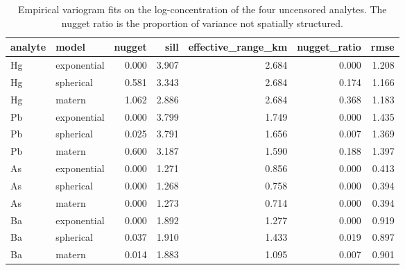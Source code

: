 \begin{table}[htbp]
\centering
\caption{Empirical variogram fits on the log-concentration of the four uncensored analytes. The nugget ratio is the proportion of variance not spatially structured.}
\label{tab:vario}
\footnotesize
\begin{tabular}{llrrrrr}
\toprule
analyte & model & nugget & sill & effective\_range\_km & nugget\_ratio & rmse \\
\midrule
Hg & exponential & 0.000 & 3.907 & 2.684 & 0.000 & 1.208 \\
Hg & spherical & 0.581 & 3.343 & 2.684 & 0.174 & 1.166 \\
Hg & matern & 1.062 & 2.886 & 2.684 & 0.368 & 1.183 \\
Pb & exponential & 0.000 & 3.799 & 1.749 & 0.000 & 1.435 \\
Pb & spherical & 0.025 & 3.791 & 1.656 & 0.007 & 1.369 \\
Pb & matern & 0.600 & 3.187 & 1.590 & 0.188 & 1.397 \\
As & exponential & 0.000 & 1.271 & 0.856 & 0.000 & 0.413 \\
As & spherical & 0.000 & 1.268 & 0.758 & 0.000 & 0.394 \\
As & matern & 0.000 & 1.273 & 0.714 & 0.000 & 0.394 \\
Ba & exponential & 0.000 & 1.892 & 1.277 & 0.000 & 0.919 \\
Ba & spherical & 0.037 & 1.910 & 1.433 & 0.019 & 0.897 \\
Ba & matern & 0.014 & 1.883 & 1.095 & 0.007 & 0.901 \\
\bottomrule
\end{tabular}
\end{table}
